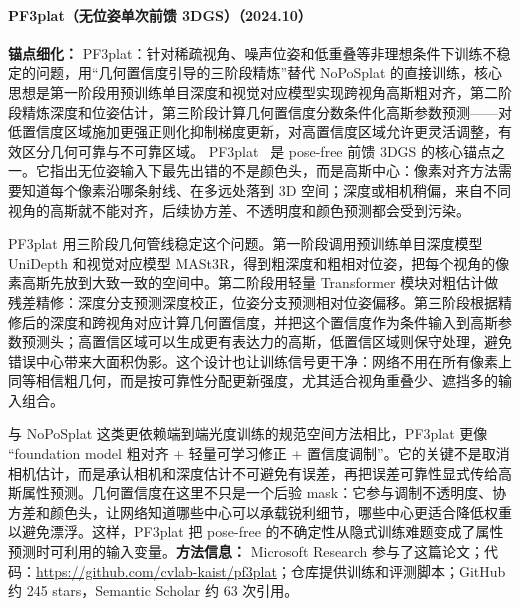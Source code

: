 \paragraph{PF3plat（无位姿单次前馈 3DGS）（2024.10）}
\textbf{锚点细化：} PF3plat：针对稀疏视角、噪声位姿和低重叠等非理想条件下训练不稳定的问题，用``几何置信度引导的三阶段精炼''替代 NoPoSplat 的直接训练，核心思想是第一阶段用预训练单目深度和视觉对应模型实现跨视角高斯粗对齐，第二阶段精炼深度和位姿估计，第三阶段计算几何置信度分数条件化高斯参数预测——对低置信度区域施加更强正则化抑制梯度更新，对高置信度区域允许更灵活调整，有效区分几何可靠与不可靠区域。
PF3plat~\cite{2410_22128} 是 pose-free 前馈 3DGS 的核心锚点之一。它指出无位姿输入下最先出错的不是颜色头，而是高斯中心：像素对齐方法需要知道每个像素沿哪条射线、在多远处落到 3D 空间；深度或相机稍偏，来自不同视角的高斯就不能对齐，后续协方差、不透明度和颜色预测都会受到污染。

PF3plat 用三阶段几何管线稳定这个问题。第一阶段调用预训练单目深度模型 UniDepth 和视觉对应模型 MASt3R，得到粗深度和粗相对位姿，把每个视角的像素高斯先放到大致一致的空间中。第二阶段用轻量 Transformer 模块对粗估计做残差精修：深度分支预测深度校正，位姿分支预测相对位姿偏移。第三阶段根据精修后的深度和跨视角对应计算几何置信度，并把这个置信度作为条件输入到高斯参数预测头；高置信区域可以生成更有表达力的高斯，低置信区域则保守处理，避免错误中心带来大面积伪影。这个设计也让训练信号更干净：网络不用在所有像素上同等相信粗几何，而是按可靠性分配更新强度，尤其适合视角重叠少、遮挡多的输入组合。

与 NoPoSplat 这类更依赖端到端光度训练的规范空间方法相比，PF3plat 更像 ``foundation model 粗对齐 + 轻量可学习修正 + 置信度调制''。它的关键不是取消相机估计，而是承认相机和深度估计不可避免有误差，再把误差可靠性显式传给高斯属性预测。几何置信度在这里不只是一个后验 mask：它参与调制不透明度、协方差和颜色头，让网络知道哪些中心可以承载锐利细节，哪些中心更适合降低权重以避免漂浮。这样，PF3plat 把 pose-free 的不确定性从隐式训练难题变成了属性预测时可利用的输入变量。\textbf{方法信息：} Microsoft Research 参与了这篇论文；代码：\url{https://github.com/cvlab-kaist/pf3plat}；仓库提供训练和评测脚本；GitHub 约 245 stars，Semantic Scholar 约 63 次引用。

